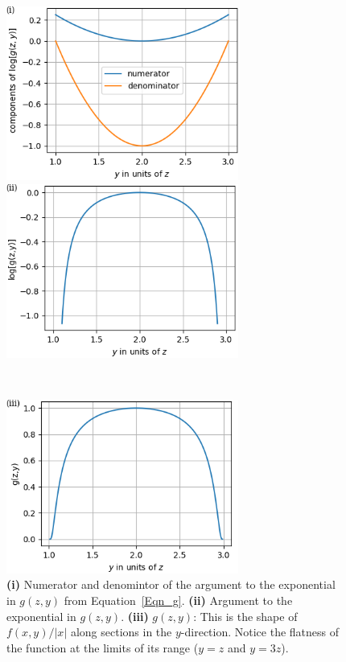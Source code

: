 \documentclass[11pt]{article}
\begin{document}
\begin{itemize}
  \begin{figure}[h]
    \centerline{\includegraphics[width=3in]{figs/Ex.VII.1.2_fig1.png}\hspace{1em}
      \includegraphics[width=3in]{figs/Ex.VII.1.2_fig2.png}}\\ \vspace{1em}
    \centerline{
      \includegraphics[width=3in]{figs/Ex.VII.1.2_fig3.png}}
    \caption{\small{\textbf{(i)} Numerator and denomintor of the argument to the
        exponential in $g(z,y)$ from Equation~\ref{Eqn_g}. \textbf{(ii)} Argument to
        the exponential in $g(z,y)$. \textbf{(iii)} $g(z,y)$: This is the shape of
        $f(x,y)/|x|$ along sections in the $y$-direction.  Notice the flatness of
        the function at the limits of its range ($y = z$ and $y = 3z$).}}
    \label{fig1}
  \end{figure}
  

\end{itemize}
\end{document}

